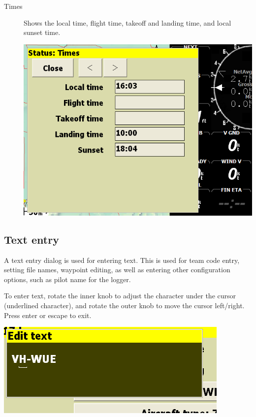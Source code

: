 \documentclass[a4paper,12pt]{refrep}
\begin{document}
\begin{description}
\item[Times]  Shows the local time, flight time, takeoff and landing time,
  and local sunset time.

\begin{center}
\includegraphics[angle=0,width=\linewidth,keepaspectratio='true']{figures/status-times.png}
\end{center}

\end{description}

\subsection*{Text entry}

A text entry dialog is used for entering text.  This is used for team
code entry, setting file names, waypoint editing, as well as entering
other configuration options, such as pilot name for the logger.

To enter text, rotate the inner knob to adjust the character under the
cursor (underlined character), and rotate the outer knob to move the
cursor left/right.  Press enter or escape to exit.

\begin{center}
\includegraphics[angle=0,width=\linewidth,keepaspectratio='true']{figures/textentry.png}
\end{center}
\end{document}

